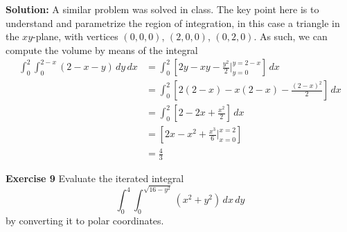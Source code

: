 \documentclass[12pt,oneside]{exam}
\newenvironment{exercise}[1]{\vspace{.1in}\noindent\textbf{Exercise #1 \hspace{.05em}}}{}
\newenvironment{newsolution}{\vspace{.1in}\noindent\textbf{Solution: \hspace{.05em}}}{}
\begin{document}
\begin{newsolution}
A similar problem was solved in class. The key point here is to understand and parametrize the region of integration, in this case a triangle in the $xy$-plane, with vertices $(0,0,0)$, $(2,0,0)$, $(0,2,0)$. As such, we can compute the volume by means of the integral 
\begin{align*}
\int_{0}^{2} \int_{0}^{2-x} (2-x-y)\, dy \, dx & = \int_{0}^{2} \left[ 2y-xy-\frac{y^2}{2} \Big|_{y=0}^{y=2-x} \right] \, dx \\
& = \int_{0}^{2} \left[ 2(2-x)-x(2-x)-\frac{(2-x)^2}{2}\right] \, dx\\
& = \int_{0}^{2} \left[2 -2x +\frac{x^2}{2} \right] \, dx \\
& = \left[ 2x -x^2 + \frac{x^3}{6} \Big|_{x=0}^{x=2}\right] \\
& = \frac{4}{3}
\end{align*}

\end{newsolution}

\begin{exercise}{9}
Evaluate the iterated integral
\begin{equation*}
 \int_{0}^{4} \int_{0}^{\sqrt{16-y^2}} (x^2+y^2) \, dx \, dy
\end{equation*}
by converting it to polar coordinates.
\end{exercise}
\end{document}
